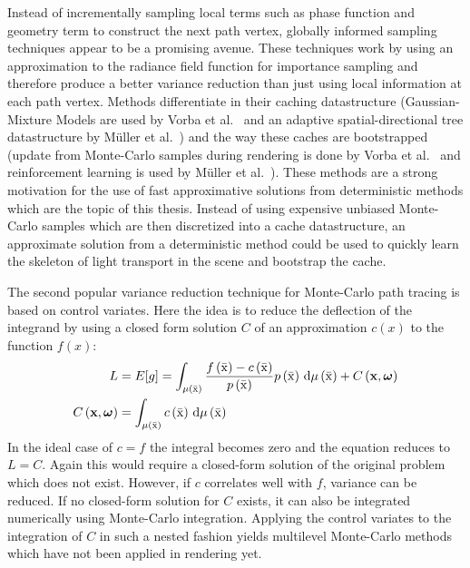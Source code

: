Instead of incrementally sampling local terms such as phase function and geometry term to construct the next path vertex, globally informed sampling techniques appear to be a promising avenue. These techniques work by using an approximation to the radiance field function for importance sampling and therefore produce a better variance reduction than just using local information at each path vertex. Methods differentiate in their caching datastructure (Gaussian-Mixture Models are used by Vorba et al.~\cite{Vorba14} and an adaptive spatial-directional tree datastructure by M\"{u}ller et al.~\cite{Mueller17}) and the way these caches are bootstrapped (update from Monte-Carlo samples during rendering is done by Vorba et al.~\cite{Vorba14} and reinforcement learning is used by M\"{u}ller et al.~\cite{Mueller17}). These methods are a strong motivation for the use of fast approximative solutions from deterministic methods which are the topic of this thesis. Instead of using expensive unbiased Monte-Carlo samples which are then discretized into a cache datastructure, an approximate solution from a deterministic method could be used to quickly learn the skeleton of light transport in the scene and bootstrap the cache.

The second popular variance reduction technique for Monte-Carlo path tracing is based on control variates. Here the idea is to reduce the deflection of the integrand by using a closed form solution $C$ of an approximation $c\left(x\right)$ to the function $f\left(x\right)$:
\begin{align}
L &= E[g] =
\int_{\mu\left(\bar{\mathrm{x}}\right)}
\frac{f\left(\bar{\mathrm{x}}\right)-c\left(\bar{\mathrm{x}}\right)}{p\left(\bar{\mathrm{x}}\right)}p\left(\bar{\mathrm{x}}\right)
\,\mathrm{d}\mu\left(\bar{\mathrm{x}}\right)
+C\left(\boldsymbol{\mathbf{x}}, \boldsymbol{\mathbf{\omega}}\right)
\\
C\left(\boldsymbol{\mathbf{x}}, \boldsymbol{\mathbf{\omega}}\right) &= 
\int_{\mu\left(\bar{\mathrm{x}}\right)}
c\left(\bar{\mathrm{x}}\right)
\,\mathrm{d}\mu\left(\bar{\mathrm{x}}\right)
\end{align}
In the ideal case of $c=f$ the integral becomes zero and the equation reduces to $L=C$. Again this would require a closed-form solution of the original problem which does not exist. However, if $c$ correlates well with $f$, variance can be reduced. If no closed-form solution for $C$ exists, it can also be integrated numerically using Monte-Carlo integration. Applying the control variates to the integration of $C$ in such a nested fashion yields multilevel Monte-Carlo methods which have not been applied in rendering yet. 

